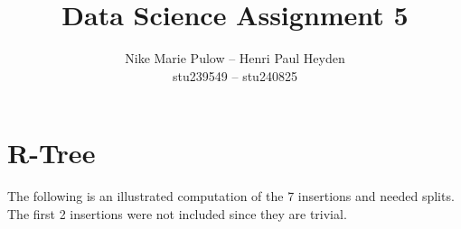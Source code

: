 

\usepackage{booktabs}

\newcommand{\nr}{5}
\title{Data Science Assignment \nr}
\author{Nike Marie Pulow -- Henri Paul Heyden \\ \small stu239549 -- stu240825}
\date{}


    \maketitle
    \section{R-Tree}
    The following is an illustrated computation of the 7 insertions and needed splits. \\
    The first 2 insertions were not included since they are trivial.
